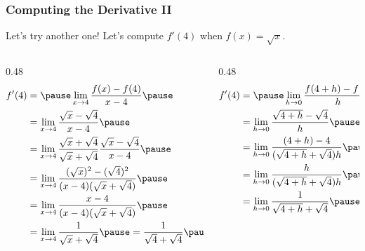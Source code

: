\documentclass{ltx-talk}
\begin{document}
\begin{frame}
  \frametitle{Computing the Derivative II}
  Let's try another one! \pause Let's compute $f'(4)$ when $f(x) = \sqrt{x}$. \pause

  \begin{columns}
    \begin{column}{0.48\textwidth}
      \begin{align}
        f'(4) &= \pause \lim \limits_{x\rightarrow 4} \dfrac{f(x) - f(4)}{x - 4} \pause \\
              &= \lim\limits_{x \rightarrow 4} \dfrac{\sqrt{x} - \sqrt{4}}{x - 4} \pause \\
              &= \lim\limits_{x \rightarrow 4} \dfrac{\sqrt{x} + \sqrt{4}}{\sqrt{x} + \sqrt{4}} \dfrac{\sqrt{x} - \sqrt{4}}{x - 4} \pause \\
              &= \lim\limits_{x \rightarrow 4} \dfrac{(\sqrt{x})^2 - (\sqrt{4})^2}{(x - 4)(\sqrt{x} + \sqrt{4})} \pause \\
              &= \lim\limits_{x \rightarrow 4} \dfrac{x - 4}{(x - 4)(\sqrt{x} + \sqrt{4})} \pause \\
              &= \lim\limits_{x \rightarrow 4} \dfrac{1}{\sqrt{x} + \sqrt{4}}
              \pause = \dfrac{1}{\sqrt{4} + \sqrt{4}} \pause = \dfrac{1}{4} \pause
      \end{align}
    \end{column}
    \begin{column}{0.48\textwidth}
      \begin{align}
        f'(4) &= \pause \lim \limits_{h \rightarrow 0} \dfrac{f(4 + h) - f(4)}{h} \pause \\
              &= \lim \limits_{h \rightarrow 0} \dfrac{\sqrt{4 + h} - \sqrt{4}}{h} \pause \\
              &= \lim \limits_{h \rightarrow 0} \dfrac{(4 + h) - 4}{(\sqrt{4 + h} + \sqrt{4})h} \pause \\
              &= \lim \limits_{h \rightarrow 0} \dfrac{h}{(\sqrt{4 + h} + \sqrt{4}) h} \pause \\
              &= \lim \limits_{h \rightarrow 0} \dfrac{1}{\sqrt{4 + h} + \sqrt{4}} \pause = \dfrac{1}{4}
      \end{align}
    \end{column}
  \end{columns}
\end{frame}
\end{document}
